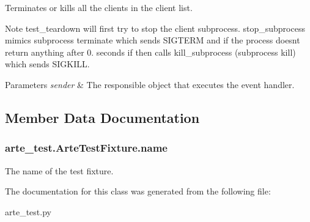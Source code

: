 Terminates or kills all the clients in the client list. 

\begin{DoxyNote}{Note}
test\+\_\+teardown will first try to stop the client subprocess. stop\+\_\+subprocess mimics subprocess terminate which sends S\+I\+G\+T\+E\+RM and if the process doesn\textquotesingle{}t return anything after 0. seconds if then calls kill\+\_\+subprocess (subprocess kill) which sends S\+I\+G\+K\+I\+LL.
\end{DoxyNote}

\begin{DoxyParams}{Parameters}
{\em sender} & The responsible object that executes the event handler. \\
\hline
\end{DoxyParams}


\subsection{Member Data Documentation}
\subsubsection[{name}]{\setlength{\rightskip}{0pt plus 5cm}arte\+\_\+test.\+Arte\+Test\+Fixture.\+name}\label{classarte__test_1_1_arte_test_fixture_abe682da10ac998fb93aa256004362abb}


The name of the test fixture. 



The documentation for this class was generated from the following file\+:\begin{DoxyCompactItemize}
\item 
arte\+\_\+test.\+py\end{DoxyCompactItemize}
